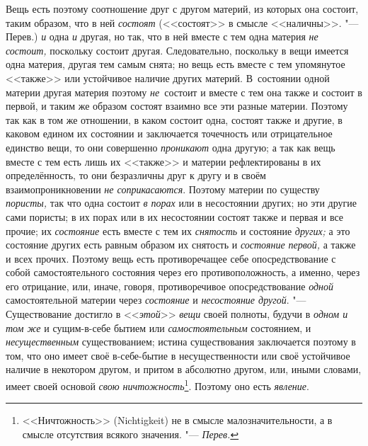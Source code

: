 Вещь есть поэтому соотношение друг с другом материй, из которых она состоит,
таким образом, что в ней {\em состоят} (<<состоят>> в
смысле <<наличны>>. "--- Перев.) {\em и} одна
{\em и} другая, но так, что в ней вместе с тем одна
материя {\em не состоит,} поскольку состоит другая.
Следовательно, поскольку в вещи имеется одна материя, другая тем самым
снята; но вещь есть вместе с тем упомянутое <<также>> или устойчивое наличие
других материй. В~состоянии одной материи другая материя поэтому
{\em не}~состоит и вместе с тем она также и состоит в
первой, и таким же образом состоят взаимно все эти разные материи. Поэтому
так как в том же отношении, в каком состоит одна, состоят также и другие, в
каковом едином их состоянии и заключается точечность или отрицательное
единство вещи, то они совершенно {\em проникают} одна
другую; а так как вещь вместе с тем есть лишь их <<также>> и материи
рефлектированы в их определённость, то они безразличны друг к другу и в
своём взаимопроникновении {\em не соприкасаются}.
Поэтому материи по существу {\em пористы,} так что одна
состоит {\em в порах} или в несостоянии других; но эти
другие сами пористы; в их порах или в их несостоянии состоят также и первая
и все прочие; их {\em состояние} есть вместе с тем их
{\em снятость} и состояние {\em других;} а это состояние других есть равным
образом их снятость и {\em состояние первой,} а также и
всех прочих. Поэтому вещь есть противоречащее себе опосредствование с собой
самостоятельного состояния через его противоположность, а именно, через его
отрицание, или, иначе, говоря, противоречивое опосредствование
{\em одной} самостоятельной материи через {\em состояние} и {\em несостояние
другой}. "--- Существование достигло в <<{\em этой}>> {\em вещи} своей
полноты, будучи в {\em одном и том же} и сущим-в-себе
бытием или {\em самостоятельным} состоянием, и
{\em несущественным} существованием; истина
существования заключается поэтому в том, что оно имеет своё в-себе-бытие в
несущественности или своё устойчивое наличие в некотором другом, и притом в
абсолютно другом, или, иными словами, имеет своей основой
{\em свою ничтожность}\footnote{<<Ничтожность>> (Nichtig\-keit) не
в смысле малозначительности, а в смысле отсутствия всякого
значения. "--- {\em Перев.}}. Поэтому оно есть {\em явление}.


